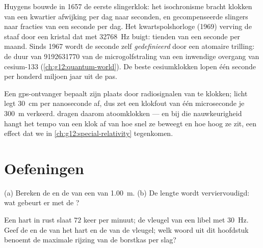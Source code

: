 \begin{example}\label{ex:g12:oscillators-and-time:clocks}
Huygens bouwde in \num{1657} de eerste slingerklok: het isochronisme bracht
klokken van een kwartier afwijking per dag naar seconden, en gecompenseerde
slingers naar fracties van een seconde per dag. Het kwartspolshorloge
(\num{1969}) verving de staaf door een kristal dat met \qty{32768}{Hz} buigt:
tienden van een seconde per maand. Sinds \num{1967} wordt de seconde zelf
\emph{gedefinieerd} door een atomaire trilling: de duur van \num{9192631770}
 van de microgolfstraling van een inwendige overgang van cesium-133
(\cref{ch:g12:quantum-world}). De beste cesiumklokken lopen één seconde per
honderd miljoen jaar uit de pas.
\end{example}

\begin{remark}\label{rem:g12:oscillators-and-time:gps}
Een gps-ontvanger bepaalt zijn plaats door radiosignalen van  te
klokken; licht legt \qty{30}{cm} per nanoseconde af, dus zet een klokfout van
één microseconde je \qty{300}{m} verkeerd.  dragen daarom
atoomklokken --- en bij die nauwkeurigheid hangt het tempo van een klok af van
hoe snel ze beweegt en hoe hoog ze zit, een effect dat we in
\cref{ch:g12:special-relativity} tegenkomen.
\end{remark}

\section{Oefeningen}

\begin{exercise}[$\star$]\label{exo:g12:oscillators-and-time:1}
(a) Bereken de  en de  van een  van
\qty{1.00}{m}. (b) De lengte wordt verviervoudigd: wat gebeurt er met de
?
\end{exercise}

\begin{exercise}[$\star$]\label{exo:g12:oscillators-and-time:2}
Een hart in rust slaat $72$ keer per minuut; de vleugel van een libel met
\qty{30}{Hz}. Geef de  en de  van het hart en de  van
de vleugel; welk woord uit dit hoofdstuk benoemt de maximale rijzing van de
borstkas per slag?
\end{exercise}

